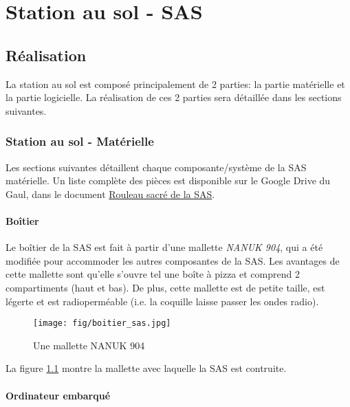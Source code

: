 \chapter{Station au sol - SAS}
\label{chap:sas}

\section{Réalisation}

La station au sol est composé principalement de 2 parties: la partie matérielle
et la partie logicielle. La réalisation de ces 2 parties sera détaillée dans
les sections suivantes.

\subsection{Station au sol - Matérielle}

Les sections suivantes détaillent chaque composante/système de la SAS
matérielle. Un liste complète des pièces est disponible sur le Google Drive du
Gaul, dans le document \href{https://drive.google.com/open?id=1WfV-Swc37Ih476rmRLYdwrBWRaUo8ZzXshS-LzYTQF4}{Rouleau sacré de la SAS}.

\subsubsection{Boîtier}

Le boîtier de la SAS est fait à partir d'une mallette \textit{NANUK 904}, qui a
été modifiée pour accommoder les autres composantes de la SAS. Les avantages de
cette mallette sont qu'elle s'ouvre tel une boîte à pizza et comprend 2
compartiments (haut et bas). De plus, cette mallette est de petite taille, est
légerte et est radioperméable (i.e. la coquille laisse passer les ondes radio).

\begin{figure}[H]
	\center
	\texttt{[image: fig/boitier\_sas.jpg]}
	\caption{Une mallette NANUK 904}
	\label{f:boitier_sas}
\end{figure}

La figure \ref{f:boitier_sas} montre la mallette avec laquelle la SAS est
contruite.

\subsubsection{Ordinateur embarqué}



